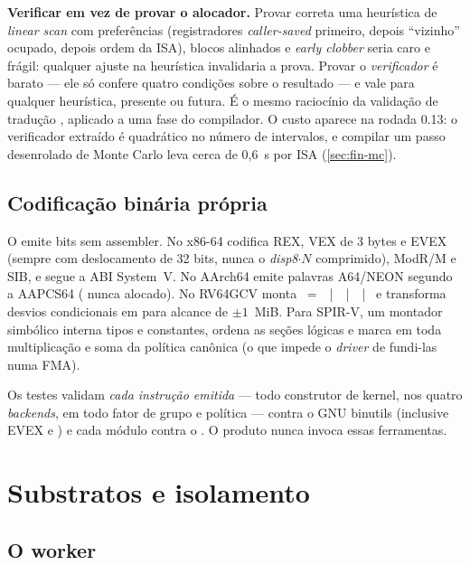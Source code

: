 \begin{mestrado}
\textbf{Verificar em vez de provar o alocador.} Provar correta uma heurística de \textit{linear scan} com preferências (registradores \textit{caller-saved} primeiro, depois ``vizinho'' ocupado, depois ordem da ISA), blocos alinhados e \textit{early clobber} seria caro e frágil: qualquer ajuste na heurística invalidaria a prova. Provar o \emph{verificador} é barato --- ele só confere quatro condições sobre o resultado --- e vale para qualquer heurística, presente ou futura. É o mesmo raciocínio da validação de tradução \cite{pnueli1998}, aplicado a uma fase do compilador. O custo aparece na rodada 0.13: o verificador extraído é quadrático no número de intervalos, e compilar um passo desenrolado de Monte Carlo leva cerca de 0,6~s por ISA (\autoref{sec:fin-mc}).
\end{mestrado}

\subsection{Codificação binária própria}

O \vapor{} emite bits sem assembler. No x86-64 codifica REX, VEX de 3 bytes e EVEX (sempre com deslocamento de 32 bits, nunca o \textit{disp8}$\cdot N$ comprimido), ModR/M e SIB, e segue a ABI System~V. No AArch64 emite palavras A64/NEON segundo a AAPCS64 ( nunca alocado). No RV64GCV monta ~=~~|~~|~~|~ e transforma desvios condicionais em  para alcance de $\pm 1$~MiB. Para SPIR-V, um montador simbólico interna tipos e constantes, ordena as seções lógicas e marca  em toda multiplicação e soma da política canônica (o que impede o \textit{driver} de fundi-las numa FMA).

Os testes validam \emph{cada instrução emitida} --- todo construtor de kernel, nos quatro \textit{backends}, em todo fator de grupo e política --- contra o GNU binutils (inclusive EVEX e ) e cada módulo contra o . O produto nunca invoca essas ferramentas.

\section{Substratos e isolamento}\label{sec:arq-substratos}

\subsection{O worker}

